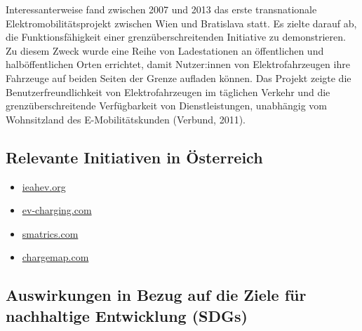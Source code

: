 \documentclass[
]{book}
\providecommand{\tightlist}{%
  \setlength{\itemsep}{0pt}\setlength{\parskip}{0pt}}
\begin{document}
Interessanterweise fand zwischen 2007 und 2013 das erste transnationale Elektromobilitätsprojekt zwischen Wien und Bratislava statt. Es zielte darauf ab, die Funktionsfähigkeit einer grenzüberschreitenden Initiative zu demonstrieren. Zu diesem Zweck wurde eine Reihe von Ladestationen an öffentlichen und halböffentlichen Orten errichtet, damit Nutzer:innen von Elektrofahrzeugen ihre Fahrzeuge auf beiden Seiten der Grenze aufladen können. Das Projekt zeigte die Benutzerfreundlichkeit von Elektrofahrzeugen im täglichen Verkehr und die grenzüberschreitende Verfügbarkeit von Dienstleistungen, unabhängig vom Wohnsitzland des E-Mobilitätskunden (Verbund, 2011).

\hypertarget{relevante-initiativen-in-uxf6sterreich-8}{%
\subsection*{Relevante Initiativen in Österreich}\label{relevante-initiativen-in-uxf6sterreich-8}}

\begin{itemize}
\tightlist
\item
  \href{http://www.ieahev.org/by-country/austria-charging-infrastructure/}{ieahev.org}
\item
  \href{https://ev-charging.com/at/en/elektrotankstellen}{ev-charging.com}
\item
  \href{https://smatrics.com/en/charging-network}{smatrics.com}
\item
  \href{https://chargemap.com/cities/wien-AT}{chargemap.com}
\end{itemize}

\hypertarget{auswirkungen-in-bezug-auf-die-ziele-fuxfcr-nachhaltige-entwicklung-sdgs-8}{%
\subsection*{Auswirkungen in Bezug auf die Ziele für nachhaltige Entwicklung (SDGs)}\label{auswirkungen-in-bezug-auf-die-ziele-fuxfcr-nachhaltige-entwicklung-sdgs-8}}
\end{document}
